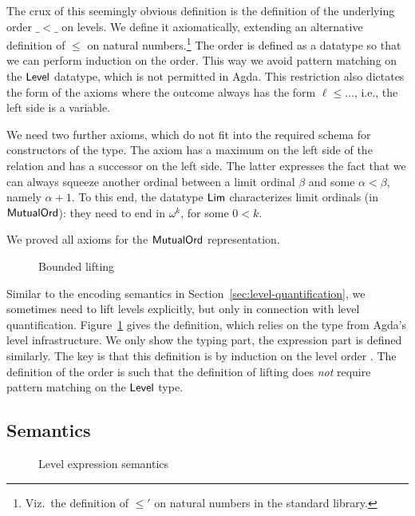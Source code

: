 \documentclass[manuscript,screen,review,anonymous]{acmart}
\begin{document}
The crux of this seemingly obvious definition is the definition of the
underlying order $\_<\_$ on levels. We define it axiomatically,
extending an alternative definition of $\le$ on natural
numbers.\footnote{Viz.\ the definition of $\le'$ on natural numbers in
  the standard library.} The order is defined as a datatype so that we
can perform induction on the order. This way we avoid pattern matching
on the $\ALevel$ datatype, which is not permitted in Agda. This
restriction also dictates the form of the axioms where the outcome
always has the form $\ell \le \dots$, i.e., the left side is a variable.

\begin{minipage}{0.45\linewidth}
  \BQLevelLe
  \BQLevelLt
\end{minipage}
\begin{minipage}{0.45\linewidth}
  \BQLim
  \BQAxiomsLe
\end{minipage}

We need two further axioms, which do not fit into the required schema
for constructors of the \AgdaFunction{$\_\le\_$} type. The axiom {\ALeLubLub} has a maximum on
the left side of the relation and {\ALtSucLim} has a successor on the
left side. The latter expresses the fact that we can always squeeze
another ordinal between a limit ordinal $\beta$ and some
$\alpha<\beta$, namely $\alpha+1$. To this end, the datatype $\ALim$
characterizes limit ordinals (in $\AMutualOrd$): they need to end in
$\omega^k$, for some $0<k$. 

We proved all axioms for the $\AMutualOrd$ representation.

\begin{figure}[tp]
  \BQBoundedLift
  \caption{Bounded lifting}
  \label{fig:eh-bounded-lifting}
\end{figure}
Similar to the encoding semantics in
Section~\ref{sec:level-quantification}, we sometimes need to lift
levels explicitly, but only in connection with level
quantification. Figure~\ref{fig:eh-bounded-lifting} gives the
definition, which relies on the {\ALift} type from Agda's level
infrastructure. We only show the typing part, the expression part is
defined similarly. The key is that this definition is by induction on
the level order \AgdaFunction{$\_\le\_$}. The definition of the order is such that
the definition of lifting does \emph{not} require pattern matching on
the $\ALevel$ type.

\subsection{Semantics}
\label{sec:semantics-1}
\begin{figure}[tp]
  \begin{minipage}[t]{0.45\linewidth}
    \EHLSemFin
  \end{minipage}
  \begin{minipage}[t]{0.45\linewidth}
    \EHLSemAny
  \end{minipage}
  \caption{Level expression semantics}
  \label{fig:eh-semantics-level-expressions}
\end{figure}
\end{document}
